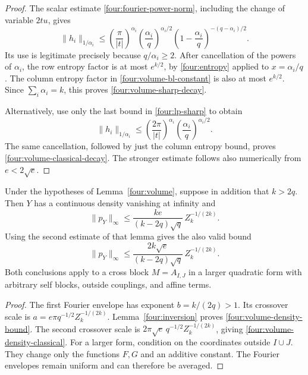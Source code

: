 \begin{proof}
The scalar estimate \eqref{four:fourier-power-norm}, including the
change of variable \(2tu\), gives
\begin{equation}\label{four:volume-hy}
 \|h_i\|_{1/\alpha_i}
 \leq\left(\frac{\pi}{|t|}\right)^{\alpha_i}
       \left(\frac{\alpha_i}{q}\right)^{\alpha_i/2}
       \left(1-\frac{\alpha_i}{q}\right)^{-(q-\alpha_i)/2}.
\end{equation}
Its use is legitimate precisely because \(q/\alpha_i\geq2\).
After cancellation of the powers of \(\alpha_i\), the row
entropy factor is at most \(e^{k/2}\), by
\eqref{four:entropy} applied to \(x=\alpha_i/q\).
The column entropy factor in \eqref{four:volume-bl-constant}
is also at most \(e^{k/2}\).  Since \(\sum_i\alpha_i=k\),
this proves \eqref{four:volume-sharp-decay}.

Alternatively, use only the last bound in
\eqref{four:lp-sharp} to obtain
\[
 \|h_i\|_{1/\alpha_i}
 \leq\left(\frac{2\pi}{|t|}\right)^{\alpha_i}
       \left(\frac{\alpha_i}{q}\right)^{\alpha_i/2}.
\]
The same cancellation, followed by just the column entropy
bound, proves \eqref{four:volume-classical-decay}.
The stronger estimate follows also numerically from
\(e<2\sqrt e\).
\end{proof}

\begin{theorem}\label{four:volume-density}
Under the hypotheses of Lemma~\ref{four:volume}, suppose in addition
that \(k>2q\).  Then \(Y\) has a continuous density vanishing at
infinity and
\begin{equation}\label{four:volume-density-bound}
 \|p_Y\|_\infty
 \leq\frac{ke}{(k-2q)\sqrt q}\,Z_k^{-1/(2k)}.
\end{equation}
Using the second estimate of that lemma gives the also valid bound
\begin{equation}\label{four:volume-density-classical}
 \|p_Y\|_\infty
 \leq\frac{2k\sqrt e}{(k-2q)\sqrt q}\,Z_k^{-1/(2k)}.
\end{equation}
Both conclusions apply to a cross block \(M=A_{I,J}\) in a larger
quadratic form with arbitrary self blocks, outside couplings, and
affine terms.
\end{theorem}
\begin{proof}
The first Fourier envelope has exponent \(b=k/(2q)>1\).
Its crossover scale is
\(a=e\pi q^{-1/2}Z_k^{-1/(2k)}\).
Lemma~\ref{four:inversion} proves
\eqref{four:volume-density-bound}.  The second crossover scale is
\(2\pi\sqrt e\,q^{-1/2}Z_k^{-1/(2k)}\), giving
\eqref{four:volume-density-classical}.
For a larger form, condition on the coordinates outside \(I\cup J\).
They change only the functions \(F,G\) and an additive constant.
The Fourier envelopes remain uniform and can therefore be averaged.
\end{proof}

